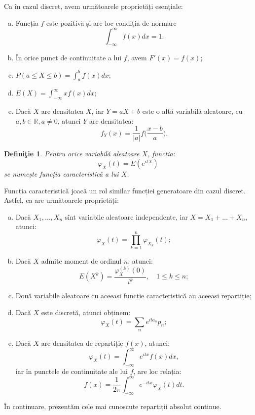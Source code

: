 \documentclass[12pt,a4paper]{article}
\newcommand\ds{\displaystyle}
\newcommand\RR{\mathbb{R}}
\theoremstyle{dotless}
\theoremstyle{dotlessdr}
\newtheorem{definition}{Defini\c{t}ie}
\begin{document}
Ca în cazul discret, avem următoarele proprietăți esențiale:
\begin{enumerate}[(a)]
\item Funcția $ f $ este pozitivă și are loc condiția de normare
  \[
    \ds\int_{-\infty}^\infty f(x) dx = 1.
  \]
\item În orice punct de continuitate a lui $ f $, avem $ F'(x) = f(x) $;
\item $ P(a \leq X \leq b) = \ds\int_a^b f(x) dx $;
\item $ E(X) = \ds\int_{-\infty}^\infty xf(x) dx $;
\item Dacă $ X $ are densitatea $ X $, iar $ Y = aX + b $ este o altă variabilă
  aleatoare, cu $ a, b \in \RR, a \neq 0 $, atunci $ Y $ are densitatea:
  \[
    f_Y(x) = \frac{1}{|a|} f \Big( \frac{x - b}{a} \Big).
  \]
\end{enumerate}

\begin{definition}\label{def:fc-car}
  Pentru orice variabilă aleatoare $ X $, funcția:
  \[
    \varphi_X(t) = E(e^{itX})
  \]
  se numește \emph{funcția caracteristică} a lui $ X $.
\end{definition}

Funcția caracteristică joacă un rol similar funcției generatoare din cazul discret.
Astfel, ea are următoarele proprietăți:
\begin{enumerate}[(a)]
\item Dacă $ X_1, \dots, X_n $ sînt variabile aleatoare independente, iar
  $ X = X_1 + \dots + X_n  $, atunci:
  \[
    \varphi_X(t) = \prod_{k = 1}^n \varphi_{X_k}(t);
  \]
\item Dacă $ X $ admite moment de ordinul $ n $, atunci:
  \[
    E(X^k) = \frac{\varphi_X^{(k)}(0)}{i^k}, \quad 1 \leq k \leq n;
  \]
\item Două variabile aleatoare cu aceeași funcție caracteristică au aceeași repartiție;
\item Dacă $ X $ este discretă, atunci obținem:
  \[
    \varphi_X(t) = \sum_n e^{ita_n} p_n;
  \]
\item Dacă $ X $ are densitatea de repartiție $ f(x) $, atunci:
  \[
    \varphi_X(t) = \int_{-\infty}^\infty e^{itx} f(x) dx,
  \]
  iar în punctele de continuitate ale lui $ f $, are loc relația:
  \[
    f(x) = \frac{1}{2\pi} \int_{-\infty}^\infty e^{-itx} \varphi_X(t) dt.
  \]
\end{enumerate}

În continuare, prezentăm cele mai cunoscute repartiții absolut continue.
\end{document}
